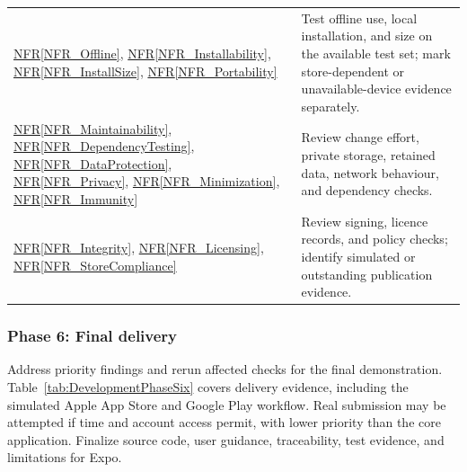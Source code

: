 \documentclass[10pt]{article}
\newcommand{\nfrref}[1]{\hyperref[#1]{NFR\ref*{#1}}}
\begin{document}
\begin{longtable}{@{}>{\raggedright\arraybackslash}p{}
>{\raggedright\arraybackslash}p{}@{}}
\nfrref{NFR_Offline}, \nfrref{NFR_Installability}, \nfrref{NFR_InstallSize}, \nfrref{NFR_Portability} & Test offline use, local installation, and size on the available test set; mark store-dependent or unavailable-device evidence separately. \\
\nfrref{NFR_Maintainability}, \nfrref{NFR_DependencyTesting}, \nfrref{NFR_DataProtection}, \nfrref{NFR_Privacy}, \nfrref{NFR_Minimization}, \nfrref{NFR_Immunity} & Review change effort, private storage, retained data, network behaviour, and dependency checks. \\
\nfrref{NFR_Integrity}, \nfrref{NFR_Licensing}, \nfrref{NFR_StoreCompliance} & Review signing, licence records, and policy checks; identify simulated or outstanding publication evidence. \\
\end{longtable}
\endgroup

\subsubsection*{Phase 6: Final delivery}

Address priority findings and rerun affected
checks for the final demonstration. Table~\ref{tab:DevelopmentPhaseSix}
covers delivery evidence, including the simulated Apple App Store and Google
Play workflow. Real submission may be attempted if time and account access
permit, with lower priority than the core application. Finalize source code,
user guidance, traceability, test evidence, and limitations for Expo.
\end{document}
